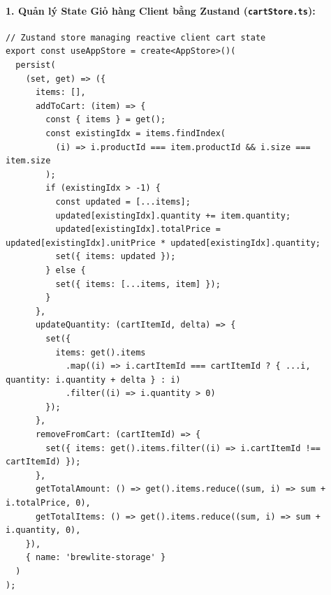 \documentclass[a4paper]{article}
\begin{document}
\paragraph{1. Quản lý State Giỏ hàng Client bằng Zustand (\texttt{cartStore.ts}):}
\begin{lstlisting}[caption={Zustand Cart State Store Implementation}]
// Zustand store managing reactive client cart state
export const useAppStore = create<AppStore>()(
  persist(
    (set, get) => ({
      items: [],
      addToCart: (item) => {
        const { items } = get();
        const existingIdx = items.findIndex(
          (i) => i.productId === item.productId && i.size === item.size
        );
        if (existingIdx > -1) {
          const updated = [...items];
          updated[existingIdx].quantity += item.quantity;
          updated[existingIdx].totalPrice = updated[existingIdx].unitPrice * updated[existingIdx].quantity;
          set({ items: updated });
        } else {
          set({ items: [...items, item] });
        }
      },
      updateQuantity: (cartItemId, delta) => {
        set({
          items: get().items
            .map((i) => i.cartItemId === cartItemId ? { ...i, quantity: i.quantity + delta } : i)
            .filter((i) => i.quantity > 0)
        });
      },
      removeFromCart: (cartItemId) => {
        set({ items: get().items.filter((i) => i.cartItemId !== cartItemId) });
      },
      getTotalAmount: () => get().items.reduce((sum, i) => sum + i.totalPrice, 0),
      getTotalItems: () => get().items.reduce((sum, i) => sum + i.quantity, 0),
    }),
    { name: 'brewlite-storage' }
  )
);
\end{lstlisting}
\end{document}
